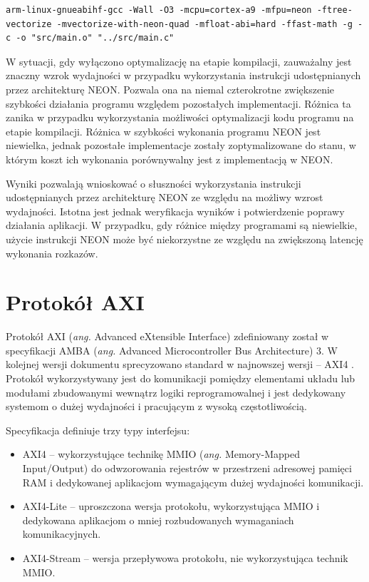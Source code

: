 \begin{lstlisting}[breaklines]
arm-linux-gnueabihf-gcc -Wall -O3 -mcpu=cortex-a9 -mfpu=neon -ftree-vectorize -mvectorize-with-neon-quad -mfloat-abi=hard -ffast-math -g -c -o "src/main.o" "../src/main.c"
\end{lstlisting}

W sytuacji, gdy wyłączono optymalizację na etapie kompilacji, zauważalny jest znaczny wzrok wydajności w przypadku wykorzystania instrukcji udostępnianych przez architekturę NEON. 
Pozwala ona na niemal czterokrotne zwiększenie szybkości działania programu względem pozostałych implementacji. 
Różnica ta zanika w przypadku wykorzystania możliwości optymalizacji kodu programu na etapie kompilacji. 
Różnica w szybkości wykonania programu NEON jest niewielka, jednak pozostałe implementacje zostały zoptymalizowane do stanu, w którym koszt ich wykonania porównywalny jest z implementacją w NEON. %

Wyniki pozwalają wnioskować o słuszności wykorzystania instrukcji udostępnianych przez architekturę NEON ze względu na możliwy wzrost wydajności. Istotna jest jednak weryfikacja wyników i potwierdzenie poprawy działania aplikacji. 
W przypadku, gdy różnice między programami są niewielkie, użycie instrukcji NEON może być niekorzystne ze względu na zwiększoną latencję wykonania rozkazów.


\section{Protokół AXI}
\label{sec:axi-std}

Protokół AXI (\emph{ang.} Advanced eXtensible Interface) zdefiniowany został w specyfikacji AMBA (\emph{ang.} Advanced Microcontroller Bus Architecture) 3. 
W kolejnej wersji dokumentu sprecyzowano standard w najnowszej wersji -- AXI4 \cite{axi-spec}. 
Protokół wykorzystywany jest do komunikacji pomiędzy elementami układu lub modułami zbudowanymi wewnątrz logiki reprogramowalnej i jest dedykowany systemom o dużej wydajności i pracującym z wysoką częstotliwością.

Specyfikacja definiuje trzy typy interfejsu:
\begin{itemize}
	\item AXI4 -- wykorzystujące technikę MMIO (\emph{ang.} Memory-Mapped Input/Output) do odwzorowania rejestrów w przestrzeni adresowej pamięci RAM i dedykowanej aplikacjom wymagającym dużej wydajności komunikacji.
	\item AXI4-Lite -- uproszczona wersja protokołu, wykorzystująca MMIO i dedykowana aplikacjom o mniej rozbudowanych wymaganiach komunikacyjnych.
	\item AXI4-Stream -- wersja przepływowa protokołu, nie wykorzystująca technik MMIO.
\end{itemize}

